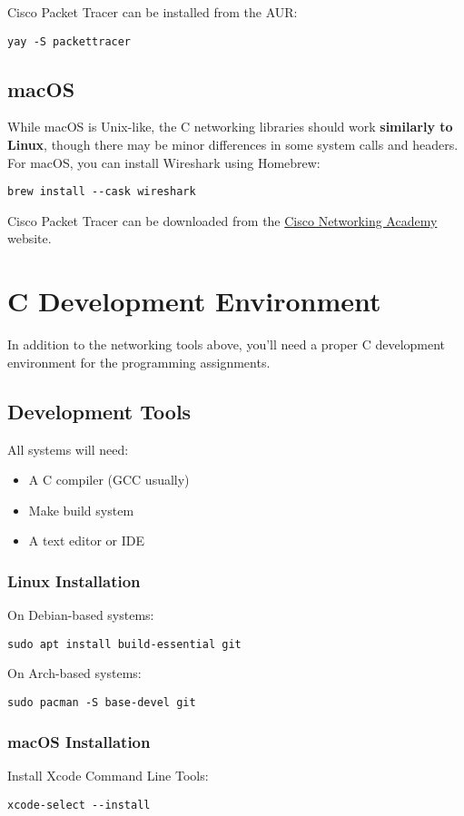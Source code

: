 Cisco Packet Tracer can be installed from the AUR\@:
\begin{verbatim}
yay -S packettracer
\end{verbatim}

\subsection{macOS}While macOS is Unix-like, the C networking libraries should work \textbf{similarly to Linux}, though there may be minor differences in some system calls and headers.
For macOS, you can install Wireshark using Homebrew:
\begin{verbatim}
brew install --cask wireshark
\end{verbatim}

Cisco Packet Tracer can be downloaded from the \href{https://www.netacad.com/courses/packet-tracer}{Cisco Networking Academy} website. 

\section{C Development Environment}

In addition to the networking tools above, you'll need a proper C development environment for the programming assignments.

\subsection{Development Tools}

All systems will need:
\begin{itemize}
    \item A C compiler (GCC usually)
    \item Make build system
    \item A text editor or IDE
\end{itemize}

\subsubsection{Linux Installation}

On Debian-based systems:
\begin{verbatim}
sudo apt install build-essential git
\end{verbatim}

On Arch-based systems:
\begin{verbatim}
sudo pacman -S base-devel git
\end{verbatim}

\subsubsection{macOS Installation}

Install Xcode Command Line Tools:
\begin{verbatim}
xcode-select --install
\end{verbatim}
